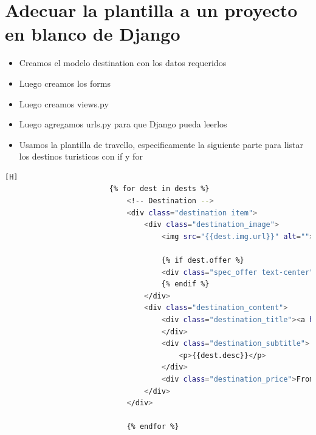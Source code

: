 \documentclass{article}
\begin{document}
\section{Adecuar la plantilla a un proyecto en blanco de Django}
	\begin{itemize}
		\item Creamos el modelo destination con los datos requeridos
	\end{itemize}

	\begin{itemize}
\section{Crear formularios de Añadir Destinos Turísticos, Modificar, Listar y Eliminar Destinos. }
		\item Luego creamos los forms 
	\end{itemize}

	\begin{itemize}
		\item Luego creamos views.py
	\end{itemize}	

	\begin{itemize}
		\item Luego agregamos urls.py para que Django pueda leerlos
	\end{itemize}	
	
	\begin{itemize}
		\item Usamos la  plantilla de travello, especificamente la siguiente parte para listar los destinos turisticos con if y for
	\end{itemize}	
	\begin{lstlisting}[language=bash,caption={Pedazo de html donde se usa  for e if}][H]
						{% for dest in dests %}
							<!-- Destination -->
							<div class="destination item">
								<div class="destination_image">
									<img src="{{dest.img.url}}" alt="">

									{% if dest.offer %}
									<div class="spec_offer text-center"><a href="#">Special Offer</a></div>
									{% endif %}
								</div>
								<div class="destination_content">
									<div class="destination_title"><a href="destinations.html">{{dest.name}}</a>
									</div>
									<div class="destination_subtitle">
										<p>{{dest.desc}}</p>
									</div>
									<div class="destination_price">From ${{dest.price}}</div>
								</div>
							</div>

							{% endfor %}

	\end{lstlisting}
\end{document}

